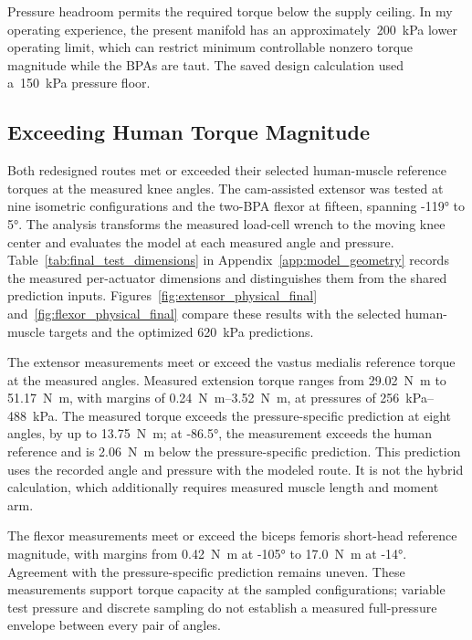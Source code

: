 Pressure headroom permits the required torque below the supply ceiling. In my operating experience, the present manifold has an approximately~\qty{200}{\kPa} lower operating limit, which can restrict minimum controllable nonzero torque magnitude while the BPAs are taut. The saved design calculation used a~\qty{150}{\kPa} pressure floor.

\subsection{Exceeding Human Torque Magnitude}\label{sec:redesign_physical}

Both redesigned routes met or exceeded their selected human-muscle reference torques at the measured knee angles. The cam-assisted extensor was tested at nine isometric configurations and the two-BPA flexor at fifteen, spanning \ang{-119} to \ang{5}. The analysis transforms the measured load-cell wrench to the moving knee center and evaluates the model at each measured angle and pressure. Table~\ref{tab:final_test_dimensions} in Appendix~\ref{app:model_geometry} records the measured per-actuator dimensions and distinguishes them from the shared prediction inputs. Figures~\ref{fig:extensor_physical_final} and~\ref{fig:flexor_physical_final} compare these results with the selected human-muscle targets and the optimized \qty{620}{\kPa} predictions.

The extensor measurements meet or exceed the vastus medialis reference torque at the measured angles. Measured extension torque ranges from \qty{29.02}{\newton\meter} to \qty{51.17}{\newton\meter}, with margins of \qtyrange{0.24}{3.52}{\newton\meter}, at pressures of \qtyrange{256}{488}{\kPa}. The measured torque exceeds the pressure-specific prediction at eight angles, by up to \qty{13.75}{\newton\meter}; at \ang{-86.5}, the measurement exceeds the human reference and is \qty{2.06}{\newton\meter} below the pressure-specific prediction. This prediction uses the recorded angle and pressure with the modeled route. It is not the hybrid calculation, which additionally requires measured muscle length and moment arm.

The flexor measurements meet or exceed the biceps femoris short-head reference magnitude, with margins from \qty{0.42}{\newton\meter} at \ang{-105} to \qty{17.0}{\newton\meter} at \ang{-14}. Agreement with the pressure-specific prediction remains uneven. These measurements support torque capacity at the sampled configurations; variable test pressure and discrete sampling do not establish a measured full-pressure envelope between every pair of angles.

